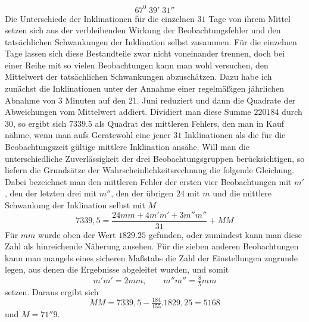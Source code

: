 \[
67^0\;39'\;31''
\]
Die Unterschiede der Inklinationen für die einzelnen $31$ Tage von ihrem Mittel setzen sich aus der verbleibenden Wirkung der Beobachtungsfehler und den tatsächlichen Schwankungen der Inklination selbst zusammen. Für die
einzelnen Tage lassen sich diese Bestandteile zwar nicht voneinander trennen, doch bei einer Reihe mit so vielen Beobachtungen kann man wohl versuchen, den Mittelwert der tatsächlichen Schwankungen abzuschätzen. Dazu habe ich zunächst die Inklinationen unter der Annahme einer regelmäßigen jährlichen Abnahme von $3$ Minuten auf den 21. Juni reduziert und dann die Quadrate der Abweichungen vom Mittelwert addiert. Dividiert man diese Summe $220184$ durch $30$, so ergibt sich $7339.5$ als Quadrat des mittleren Fehlers, den man in Kauf nähme, wenn man aufs Geratewohl eine jener $31$ Inklinationen als die für die Beobachtungszeit gültige mittlere Inklination ansähe. Will man die unterschiedliche Zuverlässigkeit der drei Beobachtungsgruppen berücksichtigen, so liefern die Grundsätze der Wahrscheinlichkeitsrechnung die folgende Gleichung. Dabei bezeichnet man den mittleren Fehler der ersten vier Beobachtungen mit $m'$, den der letzten drei mit $m''$, den der übrigen $24$ mit $m$ und die mittlere Schwankung der Inklination selbst mit $M$
\[
7339{,}5=\frac{24mm+4m'm'+3m''m''}{31}+MM
\]
Für $mm$ wurde oben der Wert $1829.25$ gefunden, oder zumindest kann man diese Zahl als hinreichende Näherung ansehen. Für die sieben anderen Beobachtungen kann man mangels eines sicheren Maßstabs die Zahl der Einstellungen zugrunde legen, aus denen die Ergebnisse abgeleitet wurden, und somit
\[
m'm'=2mm,\qquad m''m''=\tfrac85mm
\]
setzen. Daraus ergibt sich
\[
MM=7339{,}5-\tfrac{184}{155}.1829{,}25=5168
\]
und $M=71''9$.

